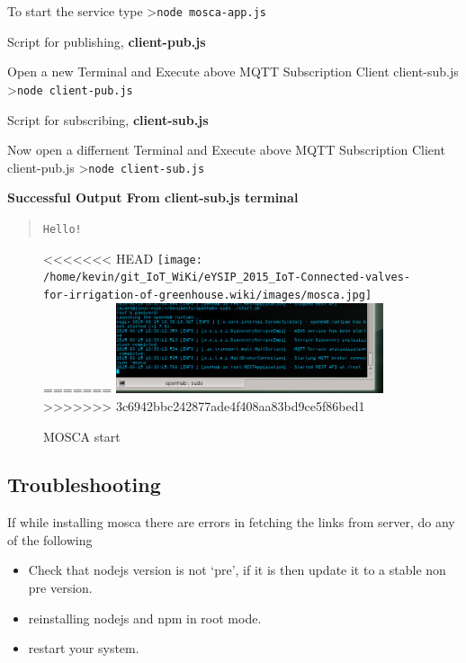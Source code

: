\documentclass[16pt]{article}
\begin{document}
To start the service type \textgreater{}\texttt{node mosca-app.js}

\vspace{0.5cm}
Script for publishing, \textbf{client-pub.js}

Open a new Terminal and Execute above MQTT Subscription Client
client-sub.js \textgreater{}\texttt{node client-pub.js}

\vspace{0.5cm}
Script for subscribing, \textbf{client-sub.js}

Now open a differnent Terminal and Execute above MQTT Subscription
Client client-pub.js \textgreater{}\texttt{node client-sub.js}

\vspace{0.5cm}
\textbf{Successful Output From client-sub.js terminal}

\begin{quote}
\texttt{Hello!}
\end{quote}


\begin{figure}
\hspace{2cm}
<<<<<<< HEAD
\texttt{[image: /home/kevin/git\_IoT\_WiKi/eYSIP\_2015\_IoT-Connected-valves-for-irrigation-of-greenhouse.wiki/images/mosca.jpg]}
=======
\includegraphics[width=0.7\textwidth]{images/mosca.jpg}
>>>>>>> 3c6942bbc242877ade4f408aa83bd9ce5f86bed1
\caption{MOSCA start}
\end{figure}

\vspace{0.5cm}

\subsection{Troubleshooting}


If while installing mosca there are errors in fetching the links from
server, do any of the following 

\begin{itemize}

\item Check that nodejs version is not
`pre', if it is then update it to a stable non pre version.
\item reinstalling nodejs and npm in root mode. 
\item restart your system.

\end{itemize}
\end{document}
